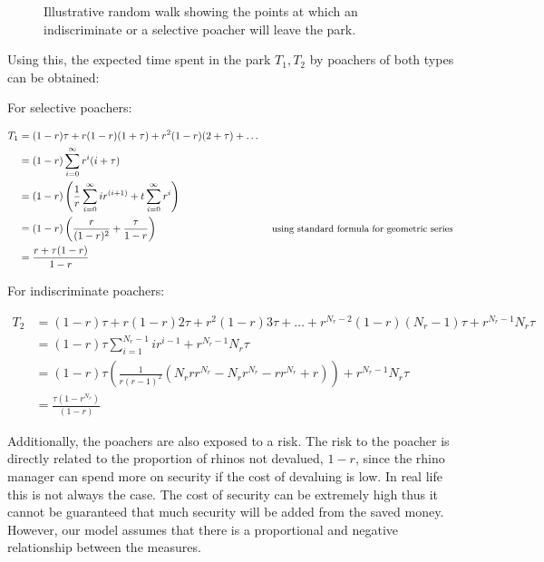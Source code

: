 \documentclass[10pt]{article}
\begin{document}
\begin{figure}[!htbp]
\begin{center}
    \end{center}
    \caption{Illustrative random walk showing the points at which an
    indiscriminate or a selective poacher will leave the park.}

    \label{fig:random_walk}
\end{figure}

Using this, the expected time spent in the park \(T_1, T_2\) by poachers of both
types can be obtained:

For selective poachers:

\begin{align}
    T_1 &= (1-r)\tau + r(1-r)(1+\tau) + r^2(1-r)(2+\tau) + \dots\\
        &= (1-r)\sum_{i=0}^{\infty}r^i(i+\tau)\\
        &= (1-r)\left(\frac{1}{r}\sum_{i=0}^{\infty}ir^{(i+1)} + t\sum_{i=0}^{\infty}r^i\right)\\
        &= (1-r)\left(\frac{r}{(1-r)^2} + \frac{\tau}{1-r}\right) && \text{ \small{using standard
formula for geometric series}}\\
    &= \frac{r+\tau(1-r)}{1-r}
\end{align}

For indiscriminate poachers:

\begin{align}
    T_2 &= (1-r)\tau + r(1-r)2\tau + r^2(1-r)3\tau + \dots + r^{N_r -
    2}(1-r)(N_r - 1)\tau + r^{N_r - 1}N_r\tau\\
        &= (1-r)\tau\sum_{i=1}^{N_r - 1}ir^{i-1} + r^{N_r - 1}N_r\tau \\
        &= (1-r)\tau\left(\frac{1}{r \left(r - 1\right)^{2}} \left(N_{r} r
r^{N_{r}} - N_{r} r^{N_{r}} - r r^{N_{r}} + r\right)\right) + r^{N_r - 1}N_r\tau \\
        &= \frac{\tau(1 - r^{N_r})}{(1 - r)}
\end{align}

Additionally, the poachers are also exposed to a risk. The risk to the poacher is
directly related to the proportion of rhinos not devalued, \(1 - r\), since
the rhino manager can spend more on security if the cost of devaluing is low.
In real life this is not always the case. The cost of security can be extremely
high thus it cannot be guaranteed that much security will be added from the
saved money. However, our model assumes that there is a proportional and negative
relationship between the measures.
\end{document}
